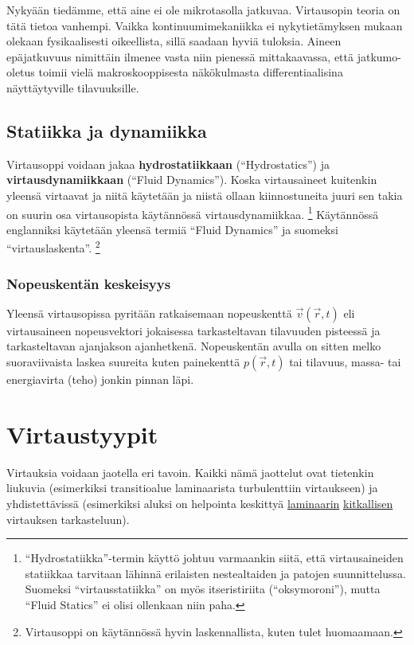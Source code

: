 \documentclass[12pt,a4paper,finnish]{book}
\begin{document}
Nykyään tiedämme, että aine ei ole mikrotasolla jatkuvaa. Virtausopin teoria on tätä tietoa vanhempi. 
Vaikka kontinuumimekaniikka ei nykytietämyksen mukaan olekaan fysikaalisesti oikeellista, sillä 
saadaan hyviä tuloksia. Aineen epäjatkuvuus nimittäin ilmenee vasta niin pienessä mittakaavassa, 
että jatkumo-oletus toimii vielä makroskooppisesta näkökulmasta differentiaalisina näyttäytyville 
tilavuuksille.

\section{Statiikka ja dynamiikka}
Virtausoppi voidaan jakaa \textbf{hydrostatiikkaan} (``Hydrostatics'') ja \textbf{virtausdynamiikkaan} 
(``Fluid Dynamics''). Koska virtausaineet kuitenkin yleensä virtaavat ja niitä käytetään ja niistä 
ollaan kiinnostuneita juuri sen takia on suurin osa virtausopista käytännössä virtausdynamiikkaa.
\footnote{``Hydrostatiikka''-termin käyttö johtuu varmaankin siitä, että virtausaineiden statiikkaa 
tarvitaan lähinnä erilaisten nestealtaiden ja patojen suunnittelussa. Suomeksi ``virtausstatiikka'' 
on myös itseristiriita (``oksymoroni''), mutta ``Fluid Statics'' ei olisi ollenkaan niin paha.}
Käytännössä englanniksi käytetään yleensä termiä ``Fluid Dynamics'' ja suomeksi ``virtauslaskenta''.
\footnote{Virtausoppi on käytännössä hyvin laskennallista, kuten tulet huomaamaan.}

\subsection{Nopeuskentän keskeisyys}
Yleensä virtausopissa pyritään ratkaisemaan nopeuskenttä \(\vec{v}(\vec{r}, t)\) eli virtausaineen 
nopeusvektori jokaisessa tarkasteltavan tilavuuden pisteessä ja tarkasteltavan ajanjakson 
ajanhetkenä. Nopeuskentän avulla on sitten melko suoraviivaista laskea suureita kuten painekenttä 
\(p(\vec{r}, t)\) tai tilavuus, massa- tai energiavirta (teho) jonkin pinnan läpi.

\chapter{Virtaustyypit}
Virtauksia voidaan jaotella eri tavoin. Kaikki nämä jaottelut ovat tietenkin liukuvia (esimerkiksi 
transitioalue laminaarista turbulenttiin virtaukseen) ja yhdistettävissä (esimerkiksi aluksi on 
helpointa keskittyä \underline{} \underline{laminaarin} 
\underline{} \underline{kitkallisen} virtauksen tarkasteluun).
\end{document}
